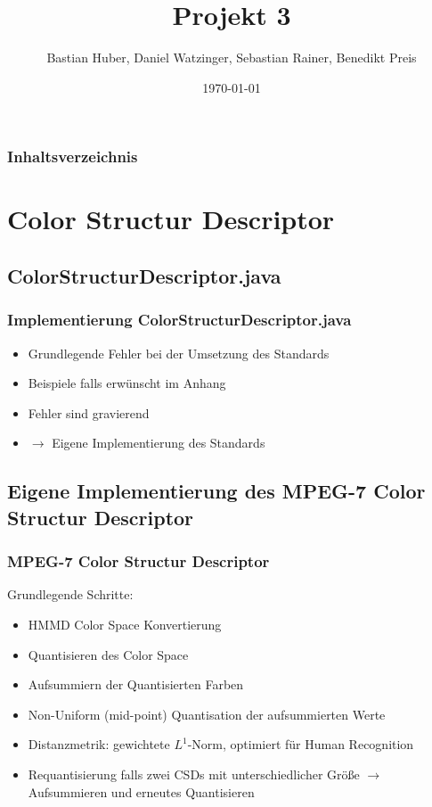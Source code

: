 \documentclass[11pt]{beamer}
\begin{document}
\graphicspath{{img/}}

\title[Multimedia Datenbanken]{Projekt 3}
\subtitle[Multimedia Datenbanken]{}
\author[Bastian Huber et al.]{Bastian Huber, Daniel Watzinger, Sebastian Rainer, Benedikt Preis}
\date{\today}

\frame{
	\titlepage
}

\begin{frame}
	\frametitle{Inhaltsverzeichnis}
	\tableofcontents
\end{frame}

\section{Color Structur Descriptor}
\subsection{ColorStructurDescriptor.java}
\begin{frame}
	\frametitle{Implementierung ColorStructurDescriptor.java}
	\begin{itemize}
		\item Grundlegende Fehler bei der Umsetzung des Standards
		\item Beispiele falls erwünscht im Anhang
		\item Fehler sind gravierend
		\item $\rightarrow$ Eigene Implementierung des Standards
	\end{itemize}
\end{frame}

\subsection{Eigene Implementierung des MPEG-7 Color Structur Descriptor}
\begin{frame}
	\frametitle{MPEG-7 Color Structur Descriptor}
	Grundlegende Schritte:
	\begin{itemize}
		\item HMMD Color Space Konvertierung
		\item Quantisieren des Color Space
		\item Aufsummiern der Quantisierten Farben
		\item Non-Uniform (mid-point) Quantisation der aufsummierten Werte
		\item Distanzmetrik: gewichtete $L^1$-Norm, optimiert für Human Recognition
		\item Requantisierung falls zwei CSDs mit unterschiedlicher Größe $\rightarrow$ Aufsummieren und erneutes Quantisieren
	\end{itemize}
\end{frame}
\end{document}
